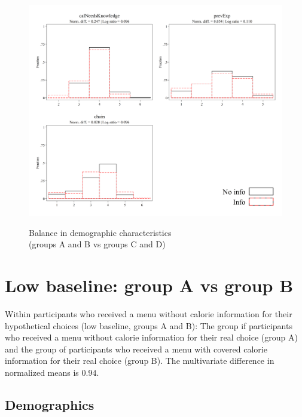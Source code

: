 \documentclass[12pt]{article}
\begin{document}
\begin{figure}[ht]
  \caption{Balance in demographic characteristics \\ (groups A and B vs groups C and D)}\label{fig:group1_calorie}
  \begin{center}
  {\includegraphics[width=1\textwidth]{./figures/covDifExp_calorieKnow.png}}
  \end{center}
\end{figure}

\FloatBarrier

\clearpage


\section{Low baseline: group A vs group B}

Within participants who received a menu without calorie information for their hypothetical choices (low baseline, groups A and B): The group if participants who received a menu without calorie information for their real choice (group A) and the group of participants who received a menu with covered calorie information for their real choice (group B). The multivariate difference in normalized means is $0.94$.

\subsection{Demographics}
\end{document}
